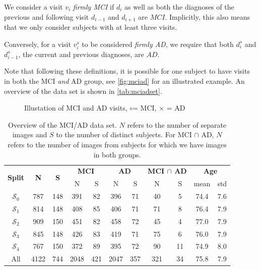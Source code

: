 We consider a visit $v_i$ \textit{firmly MCI} if $d_i$ as well as both the diagnoses of the previous and following visit $d_{i-1}$ and $d_{i+1}$ are $MCI$. Implicitly, this also means that we only consider subjects with at least three visits.

Conversely, for a visit $v^s_i$ to be considered \textit{firmly AD}, we require that both $d^s_i$ and $d^s_{i-1}$, the current and previous diagnoses, are $AD$.

Note that following these definitions, it is possible for one subject to have visits in both the MCI \textit{and} AD group, see \autoref{fig:mciad} for an illustrated example. An overview of the data set is shown in \autoref{tab:mciadset}.

\begin{figure}[h]
	\centering
	
	\caption{Illustation of MCI and AD visits, \Large$\circ$\normalsize\;= MCI, $\times$ = AD}
	\label{fig:mciad}
\end{figure}

\vspace{20pt}

\begin{table}[h]
	\begin{center}
		\begin{tabular}{c c c c c c c c c c c}
			\toprule
			\multirow{2}{*}{\bfseries Split} & 
			\multirow{2}{*}{\bfseries N} & 
			\multirow{2}{*}{\bfseries S} & 
			\multicolumn{2}{c}{\bfseries MCI} & 
			\multicolumn{2}{c}{\bfseries AD} & 
			\multicolumn{2}{c}{\bfseries MCI $\cap$ AD} &
			\multicolumn{2}{c}{\bfseries Age} \\
			\cmidrule(lr){4-5}
			\cmidrule(lr){6-7}
			\cmidrule(lr){8-9}
			\cmidrule(lr){10-11} 
			& & & N & S & N & S & N & S & mean & std \\ 
			\cmidrule(lr){1-11}
			$\mathcal{S}_0$ &  787 & 148 &  391 &  82 &  396 &  71 &  40 &  5 & 74.4 & 7.6 \\
			$\mathcal{S}_1$ &  814 & 148 &  408 &  85 &  406 &  71 &  71 &  8 & 76.4 & 7.9 \\
			$\mathcal{S}_2$ &  909 & 150 &  451 &  82 &  458 &  72 &  45 &  4 & 77.0 & 7.9 \\
			$\mathcal{S}_3$ &  845 & 148 &  426 &  83 &  419 &  71 &  75 &  6 & 76.0 & 7.9 \\
			$\mathcal{S}_4$ &  767 & 150 &  372 &  89 &  395 &  72 &  90 & 11 & 74.9 & 8.0 \\
			\cmidrule(lr){1-11}
			All             & 4122 & 744 & 2048 & 421 & 2047 & 357 & 321 & 34 & 75.8 & 7.9 \\
			\bottomrule
		\end{tabular}
		\caption{Overview of the MCI/AD data set. $N$ refers to the number of separate images and $S$ to the number of distinct subjects. For MCI $\cap$ AD, $N$ refers to the number of images from subjects for which we have images in both groups.}
		\label{tab:mciadset}
	\end{center}
\end{table}

